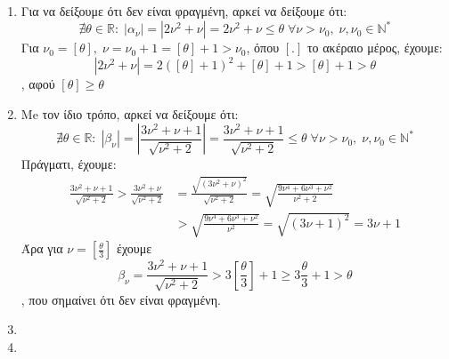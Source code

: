 \documentclass[a4paper]{article}
\numberwithin{equation}{section} %
\newcommand{\NN}{\mathbb{N}^{*}}
\begin{document}
\begin{enumerate}[label=\roman*)]
\item Για να δείξουμε ότι δεν είναι φραγμένη, αρκεί να δείξουμε ότι:
\[
\nexists \theta \in \mathbb{R}: \; \left| \alpha_\nu \right| = \left|2\nu^2 + \nu \right| = 2\nu^2 + \nu \leq \theta \; \forall \nu > \nu_0,\; \nu, \nu_0 \in \NN  
\]
Για $\nu_0 =[\theta], \; \nu=\nu_0 + 1 = [\theta]+1 > \nu_0$, όπου $[.]$ το ακέραιο μέρος, έχουμε:
\[
 \left|2\nu^2 + \nu \right|=2([\theta]+1)^2 + [\theta]+1 > [\theta]+1 > \theta
\]
, αφού $[\theta]\geq \theta$
\item Me τον ίδιο τρόπο, αρκεί να δείξουμε ότι:
\[
\nexists \theta \in \mathbb{R}: \; \left| \beta_\nu \right| = \left|\frac{3{{\nu }^{2}}+\nu +1}{\sqrt{{{\nu }^{2}}+2}}\right| = \frac{3{{\nu }^{2}}+\nu +1}{\sqrt{{{\nu }^{2}}+2}} \leq \theta \; \forall \nu > \nu_0,\; \nu, \nu_0 \in \NN  
\]
Πράγματι, έχουμε:
\[
\begin{split}
\frac{3{{\nu }^{2}}+\nu +1}{\sqrt{{{\nu }^{2}}+2}}>\frac{3{{\nu }^{2}}+\nu }{\sqrt{{{\nu }^{2}}+2}}
&=\frac{\sqrt{{{\left( 3{{\nu }^{2}}+\nu  \right)}^{2}}}}{\sqrt{{{\nu }^{2}}+2}}=\sqrt{\frac{9{{\nu }^{4}}+6{{\nu }^{3}}+{{\nu }^{2}}}{{{\nu }^{2}}+2}}\\
&>\sqrt{\frac{9{{\nu }^{4}}+6{{\nu }^{3}}+{{\nu }^{2}}}{{{\nu }^{2}}}}=\sqrt{{{\left( 3\nu +1 \right)}^{2}}}=3\nu +1
\end{split}
\]
Άρα για $\nu = \left[\tfrac{\theta}{3}\right]$ έχουμε
\[
\beta_\nu = \frac{3{{\nu }^{2}}+\nu +1}{\sqrt{{{\nu }^{2}}+2}} > 3\left[\frac{\theta}{3}\right]+1 \geq 3\frac{\theta}{3}+1 > \theta
\]
, που σημαίνει ότι δεν είναι φραγμένη.
\item
\item
\end{enumerate}
\end{document}
